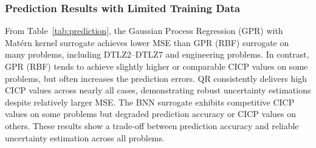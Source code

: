 \documentclass{article}
\begin{document}
\subsubsection{Prediction Results with Limited Training Data}
From Table~\ref{tab:prediction}, the Gaussian Process Regression (GPR) with Mat\'ern kernel surrogate \cite{kernel_Matern_52} achieves lower MSE than GPR (RBF) surrogate \cite{gaussian_kernel} on many problems, including DTLZ2–DTLZ7 and engineering problems. In contrast, GPR (RBF) tends to achieve slightly higher or comparable CICP values on some problems, but often increases the prediction errors. QR \cite{ml_autogluon} consistently delivers high CICP values across nearly all cases, demonstrating robust uncertainty estimations despite relatively larger MSE. The BNN \cite{bnn} surrogate exhibits competitive CICP values on some problems but degraded prediction accuracy or CICP values on others. These results show a trade-off between prediction accuracy and reliable uncertainty estimation across all problems.
\end{document}
